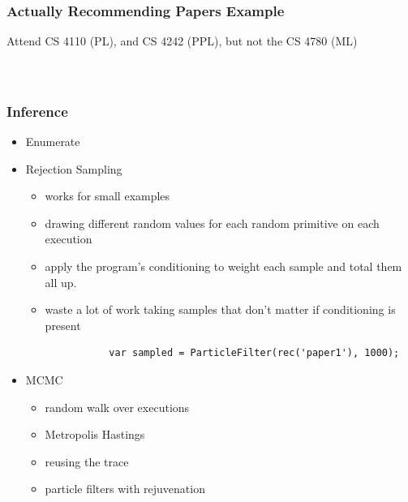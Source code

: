 \documentclass[usenames,dvipsnames]{beamer}
\begin{document}
\begin{frame}[fragile]
  \frametitle{Actually Recommending Papers Example}
  Attend CS 4110 (PL), and CS 4242 (PPL), but not the CS 4780 (ML)
  \begin{columns}[t]
    \begin{column}{.60\textwidth}
      \inputminted[fontsize=\fontsize{6}{6}\selectfont]{js}{src/recommend.wppl}
    \end{column}
    \begin{column}{.36\textwidth}
      \begin{table}[ht]
      \end{table}
    \end{column}
  \end{columns}
\end{frame}
\begin{frame}[fragile]
  \frametitle{Inference}
  \begin{itemize}
    \item Enumerate
    \item Rejection Sampling
      \begin{itemize}
        \item works for small examples
        \item drawing different random values for each random primitive on each
          execution
        \item apply the program's conditioning to weight each sample and total them all up.
        \item waste a lot of work taking samples that don't matter if
          conditioning is present
        \begin{verbatim}
           var sampled = ParticleFilter(rec('paper1'), 1000);
        \end{verbatim}
      \end{itemize}
    \item MCMC
      \begin{itemize}
        \item random walk over executions
        \item Metropolis Hastings
        \item reusing the trace
        \item particle filters with rejuvenation
      \end{itemize}
  \end{itemize}
\end{frame}
\end{document}
